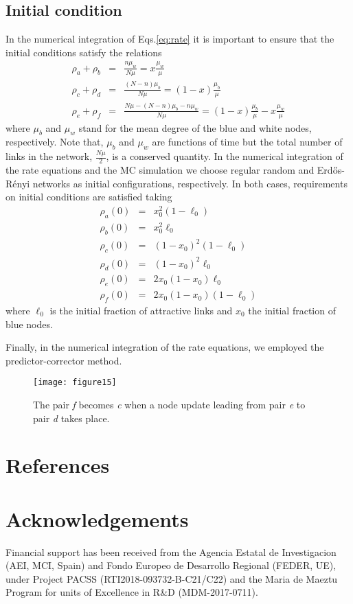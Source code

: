 \documentclass[aps,pre,notitlepage]{revtex4-1}
\begin{document}
\subsection*{Initial condition}
In the numerical integration of Eqs.\eqref{eq:rate} it is important to ensure that the initial conditions satisfy the relations 
\begin{eqnarray}
\rho_{a}+\rho_{b}&=&\frac{n\mu_w}{N\mu}=x\frac{\mu_w}{\mu} \nonumber \\
\rho_{c}+\rho_{d}&=&\frac{(N-n)\mu_b}{N\mu}=(1-x)\frac{\mu_b}{\mu} \label{rho_rel}\nonumber \\
\rho_{e}+\rho_{f}&=&\frac{N\mu-(N-n)\mu_b-n\mu_w}{N\mu}=(1-x)\frac{\mu_b}{\mu}-x\frac{\mu_w}{\mu}
\label{mu_w_b}
\end{eqnarray}
where $\mu_b$ and $\mu_w$ stand for the mean degree of the blue and white nodes, respectively. Note that, $\mu_b$ and $\mu_w$ are functions of time but the total number of links in the network, $ \frac{N\mu}{2}$, is a conserved quantity. In the numerical integration of the rate equations and the MC simulation we choose regular random and Erd\H{o}s-R\'enyi networks as initial configurations, respectively. In both cases, requirements on initial conditions are satisfied taking
\begin{eqnarray}
\rho_a(0)&=&x_0^2(1-\ell_0)\nonumber\\
\rho_b(0)&=&x_0^2\ell_0\nonumber\\
\rho_c(0)&=&(1-x_0)^2(1-\ell_0)\nonumber\\
\rho_d(0)&=&(1-x_0)^2\ell_0 \nonumber\\
\rho_e(0)&=&2x_0(1-x_0)\ell_0 \nonumber\\
\rho_f(0)&=&2x_0(1-x_0)(1-\ell_0)
\end{eqnarray}
where $\ell_0$ is the initial fraction of attractive links and $x_0$ the initial fraction of blue nodes. 

Finally, in the numerical integration of the rate equations, we employed the predictor-corrector method. 

\begin{figure}\centering
\texttt{[image: figure15]}
\caption{The pair \textit{f} becomes \textit{c} when a node update leading from pair \textit{e} to pair \textit{d} takes place.}
\label{non-linear_term}
\end{figure}


\section*{References}




\section*{Acknowledgements}
Financial support has been received from the Agencia Estatal de Investigacion (AEI, MCI, Spain) and Fondo Europeo de Desarrollo Regional (FEDER, UE), under Project PACSS (RTI2018-093732-B-C21/C22) and the Maria de Maeztu Program for units of Excellence in R\&D (MDM-2017-0711).
\end{document}
